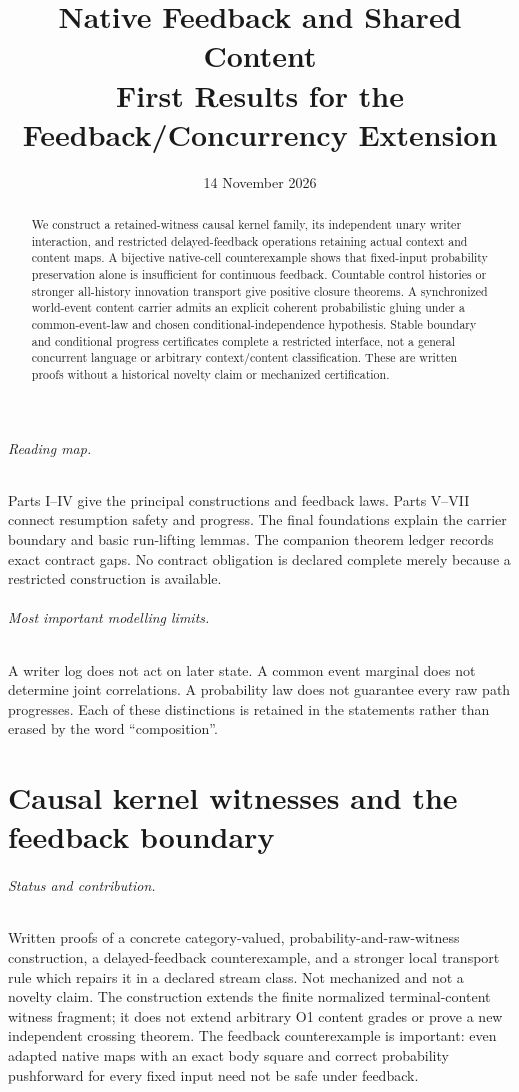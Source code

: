 \documentclass[11pt]{article}
\title{Native Feedback and Shared Content\\First Results for the Feedback/Concurrency Extension}
\author{}\date{14 November 2026}
\begin{document}
\maketitle
\begin{abstract}
We construct a retained-witness causal kernel family, its independent unary writer interaction, and restricted delayed-feedback operations retaining actual context and content maps. A bijective native-cell counterexample shows that fixed-input probability preservation alone is insufficient for continuous feedback. Countable control histories or stronger all-history innovation transport give positive closure theorems. A synchronized world-event content carrier admits an explicit coherent probabilistic gluing under a common-event-law and chosen conditional-independence hypothesis. Stable boundary and conditional progress certificates complete a restricted interface, not a general concurrent language or arbitrary context/content classification. These are written proofs without a historical novelty claim or mechanized certification.
\end{abstract}
\paragraph{Reading map.} Parts I--IV give the principal constructions and feedback laws. Parts V--VII connect resumption safety and progress. The final foundations explain the carrier boundary and basic run-lifting lemmas. The companion theorem ledger records exact contract gaps. No contract obligation is declared complete merely because a restricted construction is available.
\paragraph{Most important modelling limits.} A writer log does not act on later state. A common event marginal does not determine joint correlations. A probability law does not guarantee every raw path progresses. Each of these distinctions is retained in the statements rather than erased by the word ``composition''.
\tableofcontents
\part{Causal kernel witnesses and the feedback boundary}

\paragraph{Status and contribution.} Written proofs of a concrete category-valued, probability-and-raw-witness construction, a delayed-feedback counterexample, and a stronger local transport rule which repairs it in a declared stream class. Not mechanized and not a novelty claim. The construction extends the finite normalized terminal-content witness fragment; it does not extend arbitrary O1 content grades or prove a new independent crossing theorem. The feedback counterexample is important: even adapted native maps with an exact body square and correct probability pushforward for every fixed input need not be safe under feedback.
\end{document}
